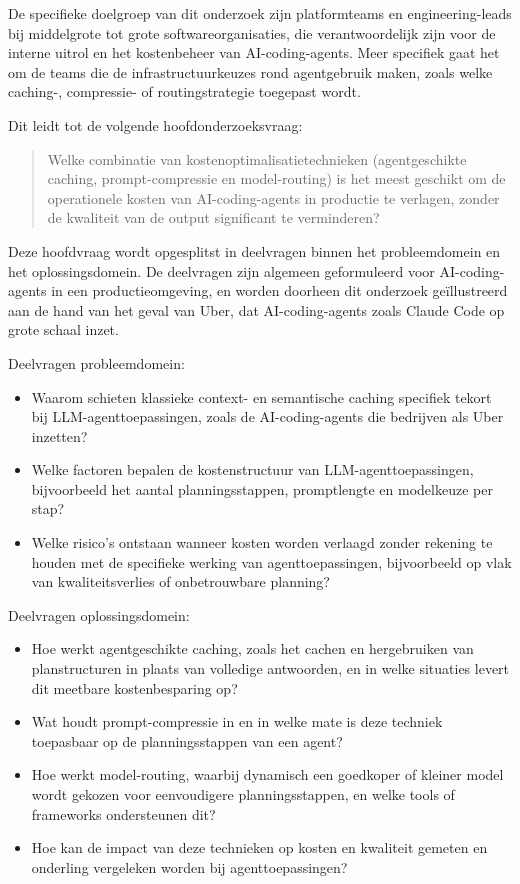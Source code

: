 \documentclass{hogent-article}
\begin{document}
De specifieke doelgroep van dit onderzoek zijn platformteams en engineering-leads bij middelgrote tot grote softwareorganisaties, die verantwoordelijk zijn voor de interne uitrol en het kostenbeheer van AI-coding-agents. Meer specifiek gaat het om de teams die de infrastructuurkeuzes rond agentgebruik maken, zoals welke caching-, compressie- of routingstrategie toegepast wordt.

Dit leidt tot de volgende hoofdonderzoeksvraag:
\begin{quote}
 Welke combinatie van kostenoptimalisatietechnieken (agentgeschikte caching, prompt-compressie en model-routing) is het meest geschikt om de operationele kosten van AI-coding-agents in productie te verlagen, zonder de kwaliteit van de output significant te verminderen?
\end{quote}

Deze hoofdvraag wordt opgesplitst in deelvragen binnen het probleemdomein en het oplossingsdomein. De deelvragen zijn algemeen geformuleerd voor AI-coding-agents in een productieomgeving, en worden doorheen dit onderzoek geïllustreerd aan de hand van het geval van Uber, dat AI-coding-agents zoals Claude Code op grote schaal inzet.

Deelvragen probleemdomein:
\begin{itemize}
  \item Waarom schieten klassieke context- en semantische caching specifiek tekort bij LLM-agenttoepassingen, zoals de AI-coding-agents die bedrijven als Uber inzetten?
  \item Welke factoren bepalen de kostenstructuur van LLM-agenttoepassingen, bijvoorbeeld het aantal planningsstappen, promptlengte en modelkeuze per stap?
  \item Welke risico's ontstaan wanneer kosten worden verlaagd zonder rekening te houden met de specifieke werking van agenttoepassingen, bijvoorbeeld op vlak van kwaliteitsverlies of onbetrouwbare planning?
\end{itemize}

Deelvragen oplossingsdomein:
\begin{itemize}
  \item Hoe werkt agentgeschikte caching, zoals het cachen en hergebruiken van planstructuren in plaats van volledige antwoorden, en in welke situaties levert dit meetbare kostenbesparing op?
  \item Wat houdt prompt-compressie in en in welke mate is deze techniek toepasbaar op de planningsstappen van een agent?
  \item Hoe werkt model-routing, waarbij dynamisch een goedkoper of kleiner model wordt gekozen voor eenvoudigere planningsstappen, en welke tools of frameworks ondersteunen dit?
  \item Hoe kan de impact van deze technieken op kosten en kwaliteit gemeten en onderling vergeleken worden bij agenttoepassingen?
\end{itemize}
\end{document}
